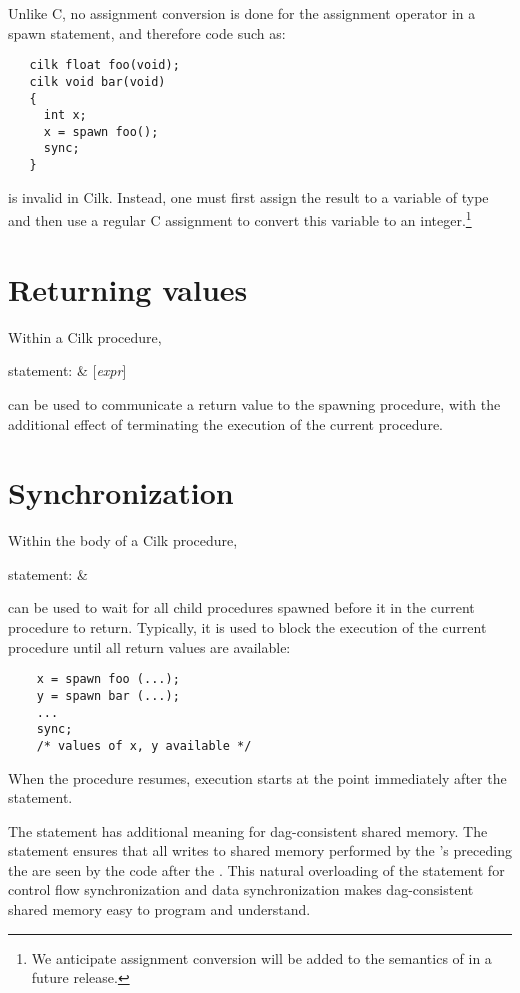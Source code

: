 Unlike C, no assignment conversion is done for the assignment operator
in a spawn statement, and therefore code such as:
\begin{verbatim}
   cilk float foo(void);
   cilk void bar(void) 
   {
     int x;
     x = spawn foo();
     sync; 
   }
\end{verbatim}
is invalid in Cilk.  Instead, one must first assign the result to a
variable of type  and then use a regular C assignment to
convert this variable to an integer.\footnote{We anticipate assignment
  conversion will be added to the semantics of  in a
  future release.}  

\section{Returning values}
Within a Cilk procedure,
\begin{syntax}
statement{\rm :} &  {\rm [}\textit{expr}{\rm ]}\cilkkw{;}
\end{syntax}
\noindent can be used to communicate a return value to the spawning procedure,
with the additional effect of terminating the execution of the current
procedure. 

\section{Synchronization}
\label{lanref:sync-sec}

Within the body of a Cilk procedure,
\begin{syntax}
statement{\rm :} & 
\end{syntax}
\noindent can be used to wait for all child procedures spawned before it in the
current procedure to return. Typically, it is used to block the
execution of the current procedure until all return values are
available:
\begin{verbatim}
    x = spawn foo (...);
    y = spawn bar (...);
    ...
    sync;
    /* values of x, y available */
\end{verbatim}
When the procedure resumes, execution starts at the point immediately
after the  statement.

The  statement has additional meaning for dag-consistent
shared memory.  The  statement ensures that all writes to shared
memory performed by the 's preceding the  are
seen by the code after the .  This natural overloading of
the  statement for control flow synchronization and data
synchronization makes dag-consistent shared memory easy to program and
understand.

